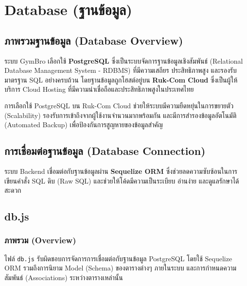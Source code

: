 \section{Database (ฐานข้อมูล)}

\subsection{ภาพรวมฐานข้อมูล (Database Overview)}
ระบบ GymBro เลือกใช้ \textbf{PostgreSQL} ซึ่งเป็นระบบจัดการฐานข้อมูลเชิงสัมพันธ์ (Relational Database Management System - RDBMS) ที่มีความเสถียร ประสิทธิภาพสูง และรองรับมาตรฐาน SQL อย่างครบถ้วน โดยฐานข้อมูลถูกโฮสต์อยู่บน \textbf{Ruk-Com Cloud} ซึ่งเป็นผู้ให้บริการ Cloud Hosting ที่มีความน่าเชื่อถือและประสิทธิภาพสูงในประเทศไทย

การเลือกใช้ PostgreSQL บน Ruk-Com Cloud ช่วยให้ระบบมีความยืดหยุ่นในการขยายตัว (Scalability) รองรับการเข้าถึงจากผู้ใช้งานจำนวนมากพร้อมกัน และมีการสำรองข้อมูลอัตโนมัติ (Automated Backup) เพื่อป้องกันการสูญหายของข้อมูลสำคัญ

\subsection{การเชื่อมต่อฐานข้อมูล (Database Connection)}
ระบบ Backend เชื่อมต่อกับฐานข้อมูลผ่าน \textbf{Sequelize ORM} ซึ่งช่วยลดความซับซ้อนในการเขียนคำสั่ง SQL ดิบ (Raw SQL) และช่วยให้โค้ดมีความเป็นระเบียบ อ่านง่าย และดูแลรักษาได้สะดวก
\subsection{db.js}

\subsubsection{ภาพรวม (Overview)}
ไฟล์ \texttt{db.js} รับผิดชอบการจัดการการเชื่อมต่อกับฐานข้อมูล PostgreSQL โดยใช้ Sequelize ORM รวมถึงการนิยาม Model (Schema) ของตารางต่างๆ ภายในระบบ และการกำหนดความสัมพันธ์ (Associations) ระหว่างตารางเหล่านั้น

